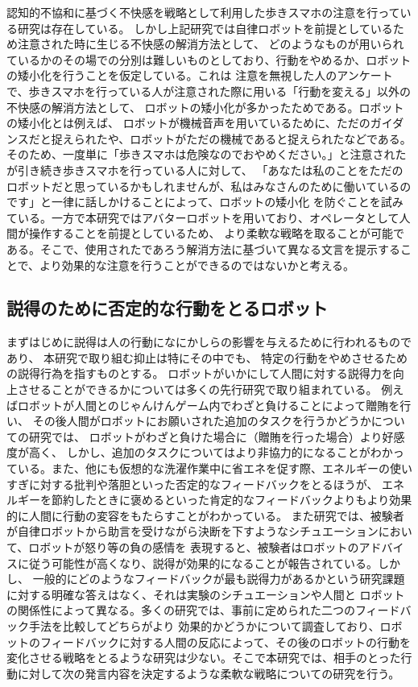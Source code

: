 \documentclass{kuisthesis}
\begin{document}
認知的不協和に基づく不快感を戦略として利用した歩きスマホの注意を行っている研究は存在している\cite{Schneider2022}。
しかし上記研究では自律ロボットを前提としているため注意された時に生じる不快感の解消方法として、
どのようなものが用いられているかのその場での分別は難しいものとしており、行動をやめるか、ロボットの矮小化を行うことを仮定している。これは
注意を無視した人のアンケートで、歩きスマホを行っている人が注意された際に用いる「行動を変える」以外の不快感の解消方法として、
ロボットの矮小化が多かったためである。ロボットの矮小化とは例えば、
ロボットが機械音声を用いているために、ただのガイダンスだと捉えられたや、ロボットがただの機械であると捉えられたなどである。
そのため、一度単に「歩きスマホは危険なのでおやめください。」と注意されたが引き続き歩きスマホを行っている人に対して、
「あなたは私のことをただのロボットだと思っているかもしれませんが、私はみなさんのために働いているのです」と一律に話しかけることによって、ロボットの矮小化
を防ぐことを試みている。一方で本研究ではアバターロボットを用いており、オペレータとして人間が操作することを前提としているため、
より柔軟な戦略を取ることが可能である。そこで、使用されたであろう解消方法に基づいて異なる文言を提示することで、より効果的な注意を行うことができるのではないかと考える。

\subsection{説得のために否定的な行動をとるロボット}
まずはじめに説得は人の行動になにかしらの影響を与えるために行われるものであり、
本研究で取り組む抑止は特にその中でも、
特定の行動をやめさせるための説得行為を指すものとする。
ロボットがいかにして人間に対する説得力を向上させることができるかについては多くの先行研究で取り組まれている。
例えばロボットが人間とのじゃんけんゲーム内でわざと負けることによって贈賄を行い、
その後人間がロボットにお願いされた追加のタスクを行うかどうかについての研究\cite{sandoval2016can}では、
ロボットがわざと負けた場合に（贈賄を行った場合）より好感度が高く、
しかし、追加のタスクについてはより非協力的になることがわかっている。また、他にも仮想的な洗濯作業中に省エネを促す際、エネルギーの使いすぎに対する批判や落胆といった否定的なフィードバックをとるほうが、
エネルギーを節約したときに褒めるといった肯定的なフィードバックよりもより効果的に人間に行動の変容をもたらすことがわかっている\cite{Midden2009}。
また研究\cite{paradeda2019makes}では、被験者が自律ロボットから助言を受けながら決断を下すようなシチュエーションにおいて、ロボットが怒り等の負の感情を
表現すると、被験者はロボットのアドバイスに従う可能性が高くなり、説得が効果的になることが報告されている。しかし、
一般的にどのようなフィードバックが最も説得力があるかという研究課題に対する明確な答えはなく、それは実験のシチュエーションや人間と
ロボットの関係性によって異なる。多くの研究では、事前に定められた二つのフィードバック手法を比較してどちらがより
効果的かどうかについて調査しており、ロボットのフィードバックに対する人間の反応によって、その後のロボットの行動を
変化させる戦略をとるような研究は少ない。そこで本研究では、相手のとった行動に対して次の発言内容を決定するような柔軟な戦略についての研究を行う。
\end{document}
